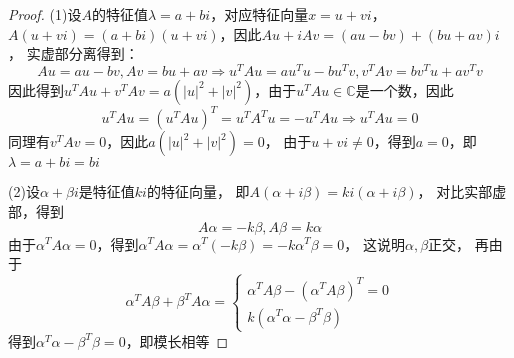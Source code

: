 \begin{proof}
  (1)设$A$的特征值$\lambda = a + bi$，对应特征向量$x = u + vi$，
  $A(u + vi) = (a + bi)(u + vi)$，因此$Au + iAv = (au - bv) + (bu + av)i$，
  实虚部分离得到：
  \begin{equation*}
    Au = au - bv,Av = bu + av \Rightarrow u^TAu = au^Tu - bu^Tv , v^TAv = bv^Tu + a v^Tv
  \end{equation*}
  因此得到$u^TAu + v^TAv = a(|u|^2 + |v|^2)$，由于$u^TAu \in \mathbb{C}$是一个数，因此
  \begin{equation*}
    u^TAu = (u^TAu)^T = u^TA^Tu = - u^TAu \Rightarrow u^TAu = 0
  \end{equation*}
  同理有$v^TAv = 0$，因此$a(|u|^2 + |v|^2) = 0$，
  由于$u + vi \neq 0$，得到$a = 0$，即$\lambda = a + bi = bi$

  (2)设$\alpha + \beta i$是特征值$k i$的特征向量，
  即$A(\alpha + i \beta) = k i(\alpha + i\beta)$，
  对比实部虚部，得到
  \begin{equation*}
    A \alpha = - k \beta, A \beta = k \alpha
  \end{equation*}
  由于$\alpha^TA\alpha = 0$，得到$\alpha^T A \alpha = \alpha^T (-k \beta) = -k \alpha^T\beta = 0$，
  这说明$\alpha,\beta$正交，
  再由于
  \begin{equation*}
    \alpha^T A \beta + \beta^T A \alpha =
    \begin{cases}
      \alpha^T A \beta - (\alpha^T A \beta)^T = 0\\
      k (\alpha^T \alpha - \beta^T \beta)
    \end{cases}
  \end{equation*}
  得到$\alpha^T \alpha - \beta^T \beta = 0$，即模长相等
\end{proof}

